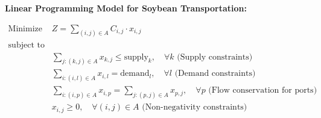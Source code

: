 \documentclass{article}
\begin{document}
\textbf{Linear Programming Model for Soybean Transportation:}

\begin{align*}
\text{Minimize } & Z = \sum_{(i,j) \in A} C_{i,j} \cdot x_{i,j} \\
\text{subject to} & \\
& \sum_{j: (k, j) \in A} x_{k,j} \leq \text{supply}_{k}, \quad \forall k \text{ (Supply constraints)} \\
& \sum_{i: (i, l) \in A} x_{i,l} = \text{demand}_{l}, \quad \forall l \text{ (Demand constraints)} \\
& \sum_{i: (i, p) \in A} x_{i,p} = \sum_{j: (p, j) \in A} x_{p,j}, \quad \forall p \text{ (Flow conservation for ports)} \\
& x_{i,j} \geq 0, \quad \forall (i,j) \in A \text{ (Non-negativity constraints)}
\end{align*}
\end{document}
